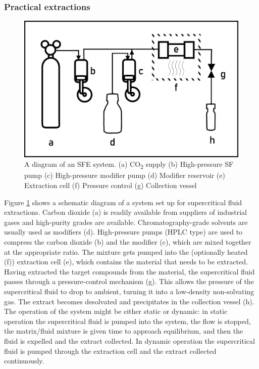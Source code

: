 \subsubsection{Practical extractions}

\begin{figure}
\centering
\includegraphics[width=\textwidth]{Figures/SFE_System}
\decoRule

\caption[SFE system diagram]{A diagram of an SFE system. (a) CO\textsubscript{2}
supply (b) High-pressure SF pump (c) High-pressure modifier pump (d) Modifier
reservoir (e) Extraction cell (f) Pressure control (g) Collection vessel}

\label{fig:sfediagram}
\end{figure}


Figure \ref{fig:sfediagram} shows a schematic diagram of a system set up for
supercritical fluid extractions. Carbon dioxide (a) is readily available from
suppliers of industrial gases and high-purity grades are available.
Chromatography-grade solvents are usually used as modifiers (d). High-pressure
pumps (HPLC type) are used to compress the carbon dioxide (b) and the modifier
(c), which are mixed together at the appropriate ratio. The mixture gets pumped
into the (optionally heated (f)) extraction cell (e), which contains the
material that needs to be extracted. Having extracted the target compounds from
the material, the supercritical fluid passes through a pressure-control
mechanism (g). This allows the pressure of the supercritical fluid to drop to
ambient, turning it into a low-density non-solvating gas. The extract becomes
desolvated and precipitates in the collection vessel (h). The operation of the
system might be either static or dynamic: in static operation the supercritical
fluid is pumped into the system, the flow is stopped, the matrix/fluid
mixture is given time to approach equilibrium, and then the fluid is expelled and
the extract collected. In dynamic operation the supercritical fluid is pumped
through the extraction cell and the extract collected continuously.


